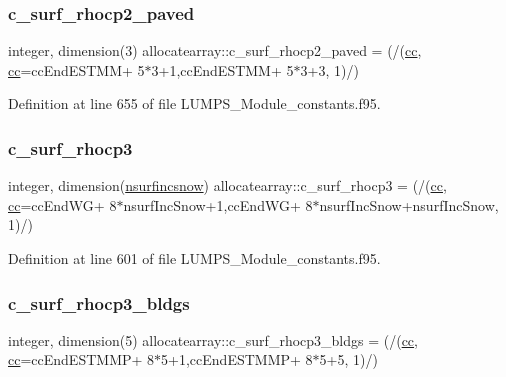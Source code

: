 \subsubsection{\texorpdfstring{c\+\_\+surf\+\_\+rhocp2\+\_\+paved}{c\_surf\_rhocp2\_paved}}
{\footnotesize\ttfamily integer, dimension(3) allocatearray\+::c\+\_\+surf\+\_\+rhocp2\+\_\+paved = (/(\hyperlink{namespaceallocatearray_ac863c81704eb507dee10f5e10741e10c}{cc}, \hyperlink{namespaceallocatearray_ac863c81704eb507dee10f5e10741e10c}{cc}=cc\+End\+E\+S\+T\+MM+ 5$\ast$3+1,cc\+End\+E\+S\+T\+MM+ 5$\ast$3+3, 1)/)}



Definition at line 655 of file L\+U\+M\+P\+S\+\_\+\+Module\+\_\+constants.\+f95.

\mbox{\label{namespaceallocatearray_aa72f745011098db1badf39ab33cea273}} 
\subsubsection{\texorpdfstring{c\+\_\+surf\+\_\+rhocp3}{c\_surf\_rhocp3}}
{\footnotesize\ttfamily integer, dimension(\hyperlink{namespaceallocatearray_af4d113f332b6759cfa22271140c9162d}{nsurfincsnow}) allocatearray\+::c\+\_\+surf\+\_\+rhocp3 = (/(\hyperlink{namespaceallocatearray_ac863c81704eb507dee10f5e10741e10c}{cc}, \hyperlink{namespaceallocatearray_ac863c81704eb507dee10f5e10741e10c}{cc}=cc\+End\+WG+ 8$\ast$nsurf\+Inc\+Snow+1,cc\+End\+WG+ 8$\ast$nsurf\+Inc\+Snow+nsurf\+Inc\+Snow, 1)/)}



Definition at line 601 of file L\+U\+M\+P\+S\+\_\+\+Module\+\_\+constants.\+f95.

\mbox{\label{namespaceallocatearray_aef54fff4822161f28c6c3da862df5520}} 
\subsubsection{\texorpdfstring{c\+\_\+surf\+\_\+rhocp3\+\_\+bldgs}{c\_surf\_rhocp3\_bldgs}}
{\footnotesize\ttfamily integer, dimension(5) allocatearray\+::c\+\_\+surf\+\_\+rhocp3\+\_\+bldgs = (/(\hyperlink{namespaceallocatearray_ac863c81704eb507dee10f5e10741e10c}{cc}, \hyperlink{namespaceallocatearray_ac863c81704eb507dee10f5e10741e10c}{cc}=cc\+End\+E\+S\+T\+M\+MP+ 8$\ast$5+1,cc\+End\+E\+S\+T\+M\+MP+ 8$\ast$5+5, 1)/)}



